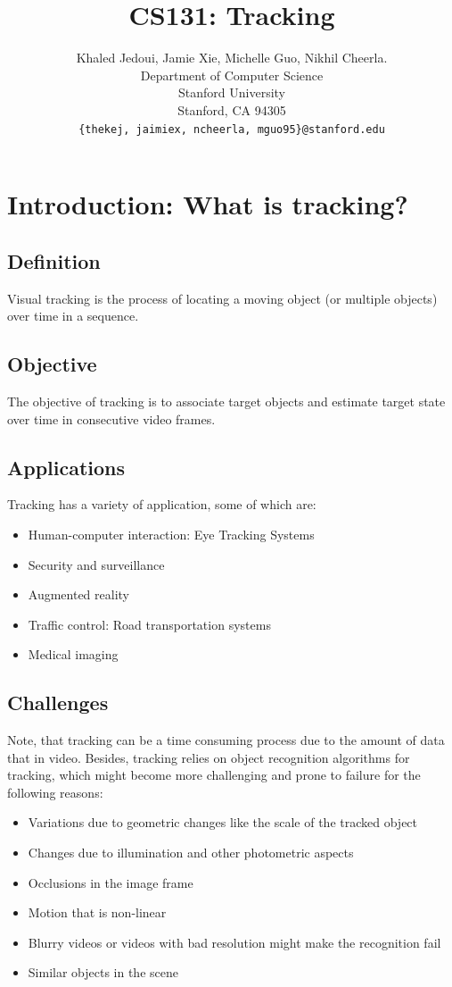 \documentclass{article}
\title{CS131: Tracking}
\author{
  Khaled Jedoui, Jamie Xie, Michelle Guo, Nikhil Cheerla. \\
  Department of Computer Science\\
  Stanford University\\
  Stanford, CA 94305 \\
  \texttt{\{thekej, jaimiex, ncheerla, mguo95\}@stanford.edu} \\
}
\begin{document}
\maketitle

\section{Introduction: What is tracking?}

\subsection{Definition}

Visual tracking is the process of locating a moving object (or multiple objects) over time in a sequence. 

\subsection{Objective}

The objective of tracking is to associate target objects and estimate target state over time in consecutive video frames.

\subsection{Applications}
Tracking has a variety of application, some of which are:
\begin{itemize}
\item Human-computer interaction: Eye Tracking Systems\cite{7456615}
\item Security and surveillance\cite{1406476}
\item Augmented reality\cite{1634325}
\item Traffic control: Road transportation systems\cite{4054748}
\item Medical imaging\cite{5484176}
\end{itemize}

\subsection{Challenges}

Note, that tracking can be a time consuming process due to the amount of data that in video.
Besides, tracking relies on object recognition algorithms for tracking, which might become more challenging and prone to failure for the following reasons:

\begin{itemize}
\item Variations due to geometric changes like the scale of the tracked object
\item Changes due to illumination and other photometric aspects 
\item Occlusions in the image frame 
\item Motion that is non-linear 
\item Blurry videos or videos with bad resolution might make the recognition fail 
\item Similar objects in the scene
\end{itemize}
\end{document}
